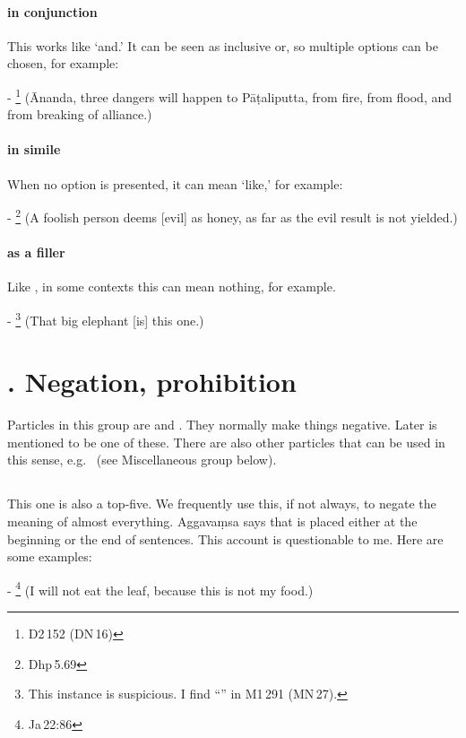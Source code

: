 \paragraph*{ in conjunction} This works like `and.' It can be seen as inclusive or, so multiple options can be chosen, for example:\par
- \footnote{D2\,152 (DN\,16)} (\=Ananda, three dangers will happen to P\=a\d taliputta, from fire, from flood, and from breaking of alliance.) \par
\paragraph*{ in simile} When no option is presented, it can mean `like,' for example:\par
- \footnote{Dhp\,5.69} (A foolish person deems [evil] as honey, as far as the evil result is not yielded.) \par
\paragraph*{ as a filler} Like , in some contexts this can mean nothing, for example.\par
- \footnote{This instance is suspicious. I find ``'' in M1\,291 (MN\,27).} (That big elephant [is] this one.) \par

\label{nipgrp3}
\section*{. Negation, prohibition}\label{nip:neg}

Particles in this group are  and . They normally make things negative. Later  is mentioned to be one of these. There are also other particles that can be used in this sense, e.g.\  (see Miscellaneous group below).

\subsection*{}\label{nip:na}
This one is also a top-five. We frequently use this, if not always, to negate the meaning of almost everything. Aggava\d msa says that  is placed either at the beginning or the end of sentences. This account is questionable to me. Here are some examples:\par
- \footnote{Ja\,22:86} (I will not eat the leaf, because this is not my food.) \par
